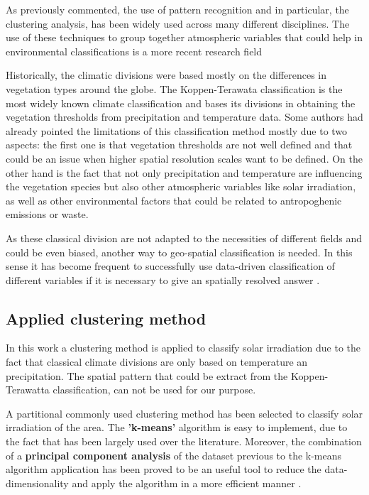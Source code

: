As previously commented, the use of pattern recognition and in particular, the clustering analysis, has been widely used across many different disciplines. The use of these techniques to group together atmospheric variables that could help in environmental classifications is a more recent research field \cite*{ZSCHEISCHLER2012897}

Historically, the climatic divisions were based mostly on the differences in vegetation types around the globe. The Koppen-Terawata classification \cite*{Kottek2006} is the most widely known climate classification and bases its divisions in obtaining the vegetation thresholds from precipitation and temperature data. Some authors had already pointed the limitations of this classification method mostly due to two aspects: the first one is that vegetation thresholds are not well defined and that could be an issue when higher spatial resolution scales want to be defined. On the other hand is the fact that not only precipitation and temperature are influencing the vegetation species but also other atmospheric variables like solar irradiation, as well as other environmental factors that could be related to antropoghenic emissions or waste.


As these classical division are not adapted to the necessities of different fields and could be even biased, another way to geo-spatial classification is needed. In this sense it has become frequent to successfully use data-driven classification of different variables if it is necessary to give an spatially resolved answer \cite{Argueso2011, Zagouras2013, Zagouras2014, Zagouras2014b, ZSCHEISCHLER2012897}. 

\subsection{Applied clustering method}

In this work a clustering method is applied to classify solar irradiation due to the fact that classical climate divisions are only based on temperature an precipitation. The spatial pattern that could be extract from the Koppen-Terawatta classification, can not be used for our purpose.

A partitional commonly used clustering method has been selected to classify solar irradiation of the area. The \textbf{'k-means'} algorithm is easy to implement, due to the fact that has been largely used over the literature. Moreover, the combination of a \textbf{principal component analysis} of the dataset previous to the k-means algorithm application has been proved to be an useful tool to reduce the data-dimensionality and apply the algorithm in a more efficient manner \cite*{Ding2004}.

